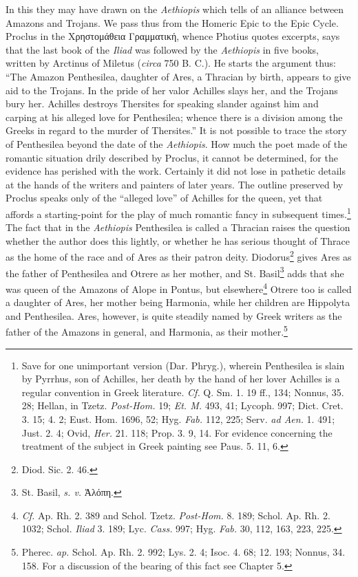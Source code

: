 \documentclass[a4paper, 12pt, oneside]{article}
\begin{document}
In this they may have drawn on the \emph{Aethiopis} which tells of an alliance between Amazons and Trojans. We pass thus from the Homeric Epic to the Epic Cycle. Proclus in the Χρηστομάθεια Γραμματική, whence Photius quotes excerpts, says that the last book of the \emph{Iliad} was followed by the \emph{Aethiopis} in five books, written by Arctinus of Miletus (\emph{circa} 750 B. C.). He starts the argument thus: ``The Amazon Penthesilea, daughter of Ares, a Thracian by birth, appears to give aid to the Trojans. In the pride of her valor Achilles slays her, and the Trojans bury her. Achilles destroys Thersites for speaking slander against him and carping at his alleged love for Penthesilea; whence there is a division among the Greeks in regard to the murder of Thersites.'' It is not possible to trace the story of Penthesilea beyond the date of the \emph{Aethiopis}. How much the poet made of the romantic situation drily described by Proclus, it cannot be determined, for the evidence has perished with the work. Certainly it did not lose in pathetic details at the hands of the writers and painters of later years. The outline preserved by Proclus speaks only of the ``alleged love'' of Achilles for the queen, yet that affords a starting-point for the play of much romantic fancy in subsequent times.\footnote{Save for one unimportant version (Dar. Phryg.), wherein Penthesilea is slain by Pyrrhus, son of Achilles, her death by the hand of her lover Achilles is a regular convention in Greek literature. \emph{Cf.} Q. Sm. 1. 19 ff., 134; Nonnus, 35. 28; Hellan, in Tzetz. \emph{Post-Hom.} 19; \emph{Et. M.} 493, 41; Lycoph. 997; Dict. Cret. 3. 15; 4. 2; Eust. Hom. 1696, 52; Hyg. \emph{Fab.} 112, 225; Serv. \emph{ad Aen.} 1. 491; Just. 2. 4; Ovid, \emph{Her.} 21. 118; Prop. 3. 9, 14. For evidence concerning the treatment of the subject in Greek painting see Paus. 5. 11, 6.} The fact that in the \emph{Aethiopis} Penthesilea is called a Thracian raises the question whether the author does this lightly, or whether he has serious thought of Thrace as the home of the race and of Ares as their patron deity. Diodorus\footnote{Diod. Sic. 2. 46.} gives Ares as the father of Penthesilea and Otrere as her mother, and St. Basil\footnote{St. Basil, \emph{s. v.} Ἀλόπη.} adds that she was queen of the Amazons of Alope in Pontus, but elsewhere\footnote{\emph{Cf.} Ap. Rh. 2. 389 and Schol. Tzetz. \emph{Post-Hom.} 8. 189; Schol. Ap. Rh. 2. 1032; Schol. \emph{Iliad} 3. 189; Lyc. \emph{Cass.} 997; Hyg. \emph{Fab.} 30, 112, 163, 223, 225.} Otrere too is called a daughter of Ares, her mother being Harmonia, while her children are Hippolyta and Penthesilea. Ares, however, is quite steadily named by Greek writers as the father of the Amazons in general, and Harmonia, as their mother.\footnote{Pherec. \emph{ap.} Schol. Ap. Rh. 2. 992; Lys. 2. 4; Isoc. 4. 68; 12. 193; Nonnus, 34. 158. For a discussion of the bearing of this fact see Chapter 5.}
\end{document}
